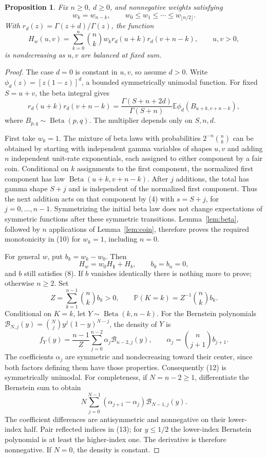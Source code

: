 \documentclass[10pt]{article}
\newtheorem{proposition}[theorem]{Proposition}
\newcommand{\E}{\mathbb E}
\newcommand{\PP}{\mathbb P}
\newcommand{\Be}{\operatorname{Beta}}
\begin{document}
\begin{proposition}\label{prop:weights}
Fix \(n\ge0,\ d\ge0\), and nonnegative weights satisfying
\[
 w_k=w_{n-k},\qquad w_0\le w_1\le\cdots\le w_{\lfloor n/2\rfloor}.
 \tag{8}
\]
With \(r_d(z)=\Gamma(z+d)/\Gamma(z)\), the function
\[
 H_w(u,v)=\sum_{k=0}^n\binom nk w_k r_d(u+k)r_d(v+n-k),\qquad u,v>0,
 \tag{9}
\]
is nondecreasing as \(u,v\) are balanced at fixed sum.
\end{proposition}
\begin{proof}
The case \(d=0\) is constant in \(u,v\), so assume \(d>0\). Write
\(\phi_d(z)=[z(1-z)]^d\), a bounded symmetrically unimodal function.
For fixed \(S=u+v\), the beta integral gives
\[
 r_d(u+k)r_d(v+n-k)
 =\frac{\Gamma(S+n+2d)}{\Gamma(S+n)}
   \E\phi_d(B_{u+k,v+n-k}),                 \tag{10}
\]
where \(B_{p,q}\sim\Be(p,q)\). The multiplier depends only on \(S,n,d\).

First take \(w_k=1\). The mixture of beta laws with probabilities
\(2^{-n}\binom nk\) can be obtained by starting with independent
gamma variables of shapes \(u,v\) and adding \(n\) independent unit-rate
exponentials, each assigned to either component by a fair coin.
Conditional on \(k\) assignments to the first component, the normalized
first component has law \(\Be(u+k,v+n-k)\).
After \(j\) additions, the total has gamma shape \(S+j\) and is
independent of the normalized first component. Thus the next addition
acts on that component by (4) with \(s=S+j\), for \(j=0,\ldots,n-1\).
Symmetrizing the initial beta law does not change expectations of
symmetric functions after these symmetric transitions.
Lemma~\ref{lem:beta}, followed by \(n\) applications of
Lemma~\ref{lem:coin}, therefore proves the required monotonicity in
(10) for \(w_k=1\), including \(n=0\).

For general \(w\), put \(b_k=w_k-w_0\). Then
\[
 H_w=w_0H_{\boldsymbol 1}+H_b,\qquad b_0=b_n=0,
 \tag{11}
\]
and \(b\) still satisfies (8). If \(b\) vanishes identically there is
nothing more to prove; otherwise \(n\ge2\). Set
\[
 Z=\sum_{k=1}^{n-1}\binom nk b_k>0,\qquad
 \PP(K=k)=Z^{-1}\binom nk b_k.
\]
Conditional on \(K=k\), let \(Y\sim\Be(k,n-k)\). For the Bernstein
polynomials \(\mathcal B_{N,j}(y)=\binom Nj y^j(1-y)^{N-j}\), the density
of \(Y\) is
\[
 f_Y(y)=\frac{n-1}{Z}\sum_{j=0}^{n-2}\alpha_j\mathcal B_{n-2,j}(y),
 \qquad \alpha_j=\binom n{j+1}b_{j+1}.       \tag{12}
\]
The coefficients \(\alpha_j\) are symmetric and nondecreasing toward
their center, since both factors defining them have those properties.
Consequently (12) is symmetrically unimodal. For completeness, if
\(N=n-2\ge1\), differentiate the Bernstein sum to obtain
\[
 N\sum_{j=0}^{N-1}(\alpha_{j+1}-\alpha_j)\mathcal B_{N-1,j}(y).
 \tag{13}
\]
The coefficient differences are antisymmetric and nonnegative on
their lower-index half. Pair reflected indices in (13); for
\(y\le1/2\) the lower-index Bernstein polynomial is at least the
higher-index one. The derivative is therefore nonnegative. If \(N=0\),
the density is constant.


\end{proof}
\end{document}
